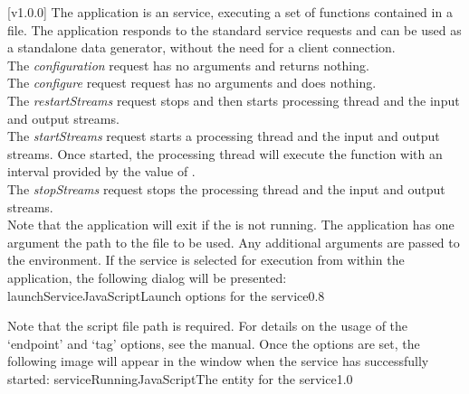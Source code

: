 [v1.0.0]
The  application is an  service,
executing a set of \JS{} functions contained in a file.
The application responds to the standard  service requests and can be used
as a standalone data generator, without the need for a client connection.\\

The \emph{configuration} request has no arguments and returns nothing.\\

The \emph{configure} request request has no arguments and does nothing.\\

The \emph{restartStreams} request stops and then starts processing thread and the input
and output streams.\\

The \emph{startStreams} request starts a processing thread and the input and output
streams.
Once started, the processing thread will execute the  function with
an interval provided by the value of .\\

The \emph{stopStreams} request stops the processing thread and the input and output
streams.\\ 

Note that the application will exit if the \emph{\RS} is not running.
The application has one argument \longDash{} the path to the \JS{} file to be used.
Any additional arguments are passed to the \JS{} environment.
\insertAppParameters
\insertTagDescription{\JSIO}
\insertFilterServiceComment
\condPage
\insertStandardServiceCommands
\secondaryEnd
\condPage
{}
If the service is selected for execution from within the \emph{\MMMU} application, the
following dialog will be presented:
%
{launchServiceJavaScript}{Launch options for the \emph{\JSIO} service}{0.8}

Note that the script file path is required.
For details on the usage of the `endpoint' and `tag' options, see the \emph{\MMMU} manual.
Once the options are set, the following image will appear in the \emph{\MMMU} window when
the service has successfully started:
%
{serviceRunningJavaScript}{The \emph{\MMMU} entity for the \emph{\JSIO} service}{1.0}

